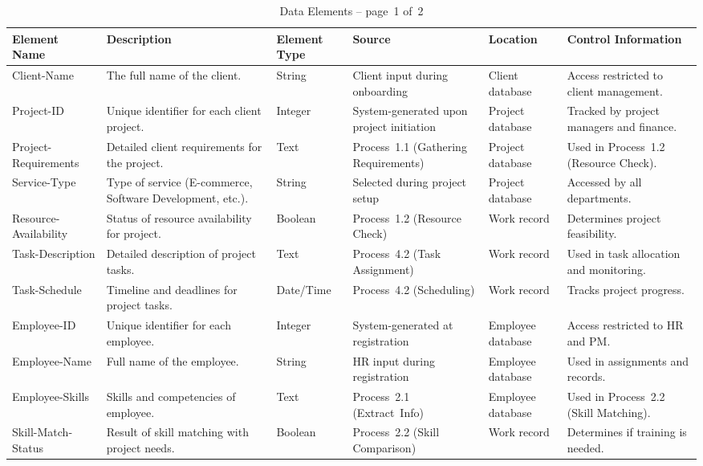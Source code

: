 \documentclass[12pt,a4paper]{article}
\begin{document}
\begin{table}[H]
\centering
\begin{tabular}{|p{2.8cm}|p{4cm}|p{1.8cm}|p{2.3cm}|p{1.8cm}|p{2.5cm}|}
\hline
\rowcolor{tableheader}
\textcolor{headertext}{\textbf{Element Name}} &
\textcolor{headertext}{\textbf{Description}} &
\textcolor{headertext}{\textbf{Element Type}} &
\textcolor{headertext}{\textbf{Source}} &
\textcolor{headertext}{\textbf{Location}} &
\textcolor{headertext}{\textbf{Control Information}} \\
\hline
Client-Name & The full name of the client. & String & Client input during onboarding & Client database & Access restricted to client management. \\
\hline
Project-ID & Unique identifier for each client project. & Integer & System-generated upon project initiation & Project database & Tracked by project managers and finance. \\
\hline
Project-Requirements & Detailed client requirements for the project. & Text & Process 1.1 (Gathering Requirements) & Project database & Used in Process 1.2 (Resource Check). \\
\hline
Service-Type & Type of service (E-commerce, Software Development, etc.). & String & Selected during project setup & Project database & Accessed by all departments. \\
\hline
Resource-Availability & Status of resource availability for project. & Boolean & Process 1.2 (Resource Check) & Work record & Determines project feasibility. \\
\hline
Task-Description & Detailed description of project tasks. & Text & Process 4.2 (Task Assignment) & Work record & Used in task allocation and monitoring. \\
\hline
Task-Schedule & Timeline and deadlines for project tasks. & Date/Time & Process 4.2 (Scheduling) & Work record & Tracks project progress. \\
\hline
Employee-ID & Unique identifier for each employee. & Integer & System-generated at registration & Employee database & Access restricted to HR and PM. \\
\hline
Employee-Name & Full name of the employee. & String & HR input during registration & Employee database & Used in assignments and records. \\
\hline
Employee-Skills & Skills and competencies of employee. & Text & Process 2.1 (Extract Info) & Employee database & Used in Process 2.2 (Skill Matching). \\
\hline
Skill-Match-Status & Result of skill matching with project needs. & Boolean & Process 2.2 (Skill Comparison) & Work record & Determines if training is needed. \\
\hline
\end{tabular}
\caption{Data Elements – page 1 of 2}
\label{tab:data_elements_part1}
\end{table}
\end{document}
